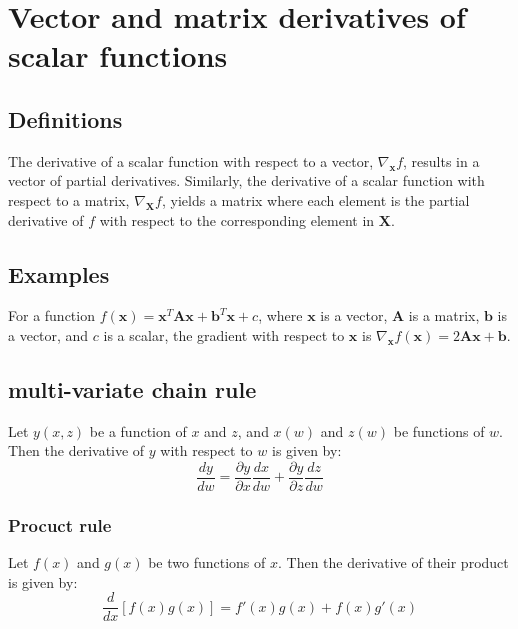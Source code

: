 \documentclass[11pt]{book} %
\begin{document}
\section{Vector and matrix derivatives of scalar functions}

\subsection{Definitions}

The derivative of a scalar function with respect to a vector, \(\nabla_{\mathbf{x}} f\), results in a vector of partial derivatives. Similarly, the derivative of a scalar function with respect to a matrix, \(\nabla_{\mathbf{X}} f\), yields a matrix where each element is the partial derivative of \(f\) with respect to the corresponding element in \(\mathbf{X}\).

\subsection{Examples}

For a function \(f(\mathbf{x}) = \mathbf{x}^T\mathbf{A}\mathbf{x} + \mathbf{b}^T\mathbf{x} + c\), where \(\mathbf{x}\) is a vector, \(\mathbf{A}\) is a matrix, \(\mathbf{b}\) is a vector, and \(c\) is a scalar, the gradient with respect to \(\mathbf{x}\) is \(\nabla_{\mathbf{x}} f(\mathbf{x}) = 2\mathbf{A}\mathbf{x} + \mathbf{b}\).

\subsection{multi-variate chain rule} \label{ssec:chain_rule}
Let $y(x,z)$ be a function of $x$ and $z$, and $x(w)$ and $z(w)$ be functions of $w$. 
Then the derivative of $y$ with respect to $w$ is given by:
\begin{equation}
    \frac{dy}{dw} = \frac{\partial y}{\partial x} \frac{dx}{dw} + \frac{\partial y}{\partial z} \frac{dz}{dw}
\end{equation}

\subsubsection{Procuct rule}
Let $f(x)$ and $g(x)$ be two functions of $x$. 
Then the derivative of their product is given by:
\begin{equation}
    \frac{d}{dx} [f(x)g(x)] = f'(x)g(x) + f(x)g'(x)
\end{equation}
\end{document}
